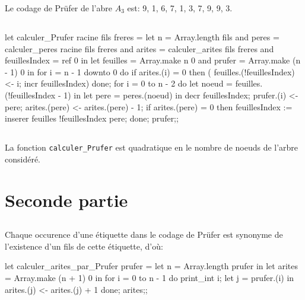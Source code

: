 \documentclass{article}
\newcommand{\code}[1]{\lstinline[style = mystyle]{#1}}
\begin{document}
			Le codage de Prüfer de l'abre $A_3$ est: 9, 1, 6, 7, 1, 3, 7, 9, 9, 3.
			
		\subsection{}
		
			
			\begin{case}
let calculer_Prufer racine fils freres =
	let n = Array.length fils and
		peres = calculer_peres racine fils freres and
		arites = calculer_arites fils freres and
		feuillesIndex = ref 0 in
	let feuilles = Array.make n 0 and prufer = Array.make (n - 1) 0 in
	for i = n - 1 downto 0 do
		if arites.(i) = 0 then
		(	feuilles.(!feuillesIndex) <- i;
			incr feuillesIndex)
	done;
	for i = 0 to n - 2 do
		let noeud = feuilles.(!feuillesIndex - 1) in
		let pere = peres.(noeud) in
			decr feuillesIndex;
			prufer.(i) <- pere;
			arites.(pere) <- arites.(pere) - 1;
			if arites.(pere) = 0 then
				feuillesIndex := inserer feuilles !feuillesIndex pere;
	done;
	prufer;;
			\end{case}
		
		\subsection{}
		
			La fonction \code{calculer_Prufer} est quadratique en le nombre de noeuds de l'arbre considéré.
		
	\section{Seconde partie}
			
		\setcounter{subsection}{26}
		\subsection{}

			Chaque occurence d'une étiquette dans le codage de Prüfer est synonyme de l'existence d'un fils de cette étiquette, d'où:
		
			\begin{case}
let calculer_arites_par_Prufer prufer =
	let n = Array.length prufer in
	let arites = Array.make (n + 1) 0 in
	for i = 0 to n - 1 do
		print_int i;
		let j = prufer.(i) in
		arites.(j) <- arites.(j) + 1
	done;
	arites;;
			\end{case}
		
		\subsection{}
		
\end{document}

